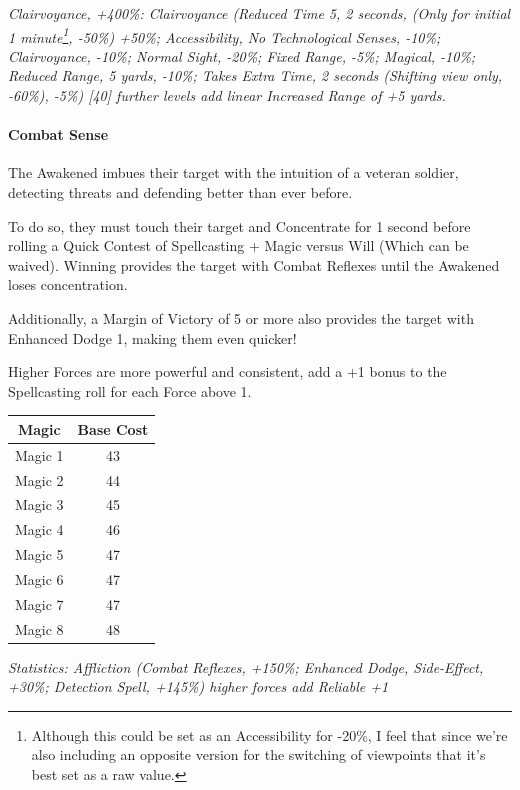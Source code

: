 \begin{multicols*}{3}
	\textcolor{OliveGreen}{\textit{Clairvoyance, +400\%: Clairvoyance (Reduced Time 5, 2 seconds, (Only for initial 1 minute\footnote{Although this could be set as an Accessibility for -20\%, I feel that since we're also including an opposite version for the switching of viewpoints that it's best set as a raw value.}, -50\%) +50\%; Accessibility, No Technological Senses, -10\%; Clairvoyance, -10\%; Normal Sight, -20\%; Fixed Range, -5\%; Magical, -10\%; Reduced Range, 5 yards, -10\%; Takes Extra Time, 2 seconds (Shifting view only, -60\%), -5\%) [40] further levels add linear Increased Range of +5 yards.}}
	
	\paragraph{Combat Sense}
	
	The Awakened imbues their target with the intuition of a veteran soldier, detecting threats and defending better than ever before.
	
	To do so, they must touch their target and Concentrate for 1 second before rolling a Quick Contest of Spellcasting + Magic versus Will (Which can be waived). Winning provides the target with Combat Reflexes until the Awakened loses concentration.
	
	Additionally, a Margin of Victory of 5 or more also provides the target with Enhanced Dodge 1, making them even quicker!
	
	Higher Forces are more powerful and consistent, add a +1 bonus to the Spellcasting roll for each Force above 1.
	
	\begin{center}
		\begin{tabular}{|c|c|}
			\hline
			Magic & Base Cost \\
			\hline
			\hline
			Magic 1 & 43 \\
			Magic 2 & 44 \\
			Magic 3 & 45 \\
			Magic 4 & 46 \\
			Magic 5 & 47 \\
			Magic 6 & 47 \\
			Magic 7 & 47 \\
			Magic 8 & 48 \\
			\hline
		\end{tabular}
	\end{center} 	
	
	\textcolor{OliveGreen}{\textit{ Statistics: Affliction (Combat Reflexes, +150\%; Enhanced Dodge, Side-Effect, +30\%; Detection Spell, +145\%) higher forces add Reliable +1 }}
	

\end{multicols*}
